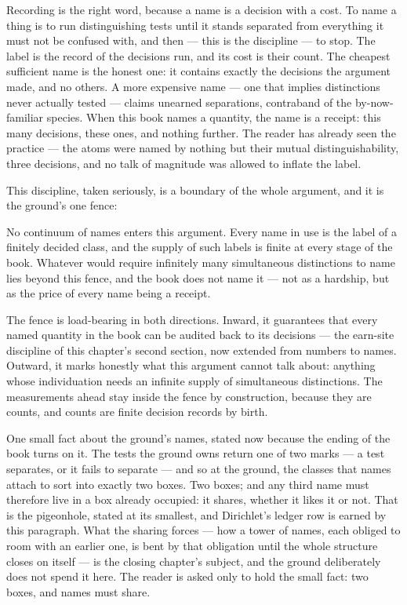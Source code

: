 Recording is the right word, because a name is a decision with a cost. To name a thing
is to run distinguishing tests until it stands separated from everything it must not be
confused with, and then --- this is the discipline --- to stop. The label is the record
of the decisions run, and its cost is their count. The cheapest sufficient name is the
honest one: it contains exactly the decisions the argument made, and no others. A more
expensive name --- one that implies distinctions never actually tested --- claims
unearned separations, contraband of the by-now-familiar species. When this book names
a quantity, the name is a receipt: this many decisions, these ones, and nothing
further. The reader has already seen the practice --- the atoms were named by nothing
but their mutual distinguishability, three decisions, and no talk of magnitude was
allowed to inflate the label.

This discipline, taken seriously, is a boundary of the whole argument, and it is the
ground's one fence:

\begin{fence}
No continuum of names enters this argument. Every name in use is the label of a
finitely decided class, and the supply of such labels is finite at every stage of the
book. Whatever would require infinitely many simultaneous distinctions to name lies
beyond this fence, and the book does not name it --- not as a hardship, but as the
price of every name being a receipt.
\end{fence}

The fence is load-bearing in both directions. Inward, it guarantees that every named
quantity in the book can be audited back to its decisions --- the earn-site discipline
of this chapter's second section, now extended from numbers to names. Outward, it
marks honestly what this argument cannot talk about: anything whose individuation
needs an infinite supply of simultaneous distinctions. The measurements ahead stay
inside the fence by construction, because they are counts, and counts are finite
decision records by birth.

One small fact about the ground's names, stated now because the ending of the book
turns on it. The tests the ground owns return one of two marks --- a test separates,
or it fails to separate --- and so at the ground, the classes that names attach to
sort into exactly two boxes. Two boxes; and any third name must therefore live in a
box already occupied: it shares, whether it likes it or not. That is the pigeonhole,
stated at its smallest, and Dirichlet's ledger row is earned by this paragraph. What
the sharing forces --- how a tower of names, each obliged to room with an earlier one,
is bent by that obligation until the whole structure closes on itself --- is the
closing chapter's subject, and the ground deliberately does not spend it here. The
reader is asked only to hold the small fact: two boxes, and names must share.

